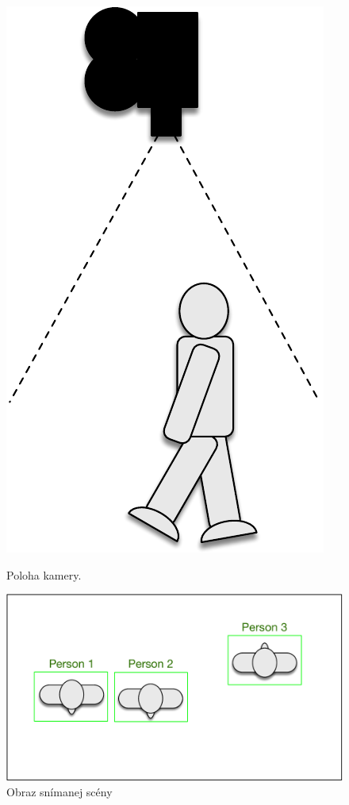 \begin{figure}[H]
  \centering
  \begin{minipage}[b]{0.2\textwidth}
    \includegraphics[width=\textwidth]{obrazky/konceptSnimania}
    \caption{Poloha kamery.}
  \end{minipage}
  \hfill
  \begin{minipage}[b]{0.5\textwidth}
    \includegraphics[width=\textwidth]{obrazky/pohladZhora}
    \caption{Obraz snímanej scény}
  \end{minipage}
\end{figure}

